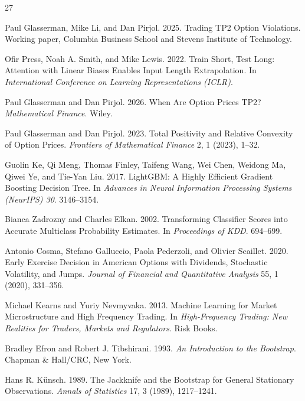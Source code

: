 \documentclass[sigconf,review,anonymous]{acmart}
\begin{document}

\begingroup
\footnotesize
\setlength{\itemsep}{0pt}
\setlength{\parskip}{0pt}
\begin{thebibliography}{27}

Paul Glasserman, Mike Li, and Dan Pirjol. 2025. Trading TP2 Option Violations. Working paper, Columbia Business School and Stevens Institute of Technology.

Ofir Press, Noah A. Smith, and Mike Lewis. 2022. Train Short, Test Long: Attention with Linear Biases Enables Input Length Extrapolation. In \textit{International Conference on Learning Representations (ICLR)}.

Paul Glasserman and Dan Pirjol. 2026. When Are Option Prices TP2? \textit{Mathematical Finance}. Wiley.

Paul Glasserman and Dan Pirjol. 2023. Total Positivity and Relative Convexity of Option Prices. \textit{Frontiers of Mathematical Finance} 2, 1 (2023), 1--32.

Guolin Ke, Qi Meng, Thomas Finley, Taifeng Wang, Wei Chen, Weidong Ma, Qiwei Ye, and Tie-Yan Liu. 2017. LightGBM: A Highly Efficient Gradient Boosting Decision Tree. In \textit{Advances in Neural Information Processing Systems (NeurIPS) 30}. 3146--3154.

Bianca Zadrozny and Charles Elkan. 2002. Transforming Classifier Scores into Accurate Multiclass Probability Estimates. In \textit{Proceedings of KDD}. 694--699.

Antonio Cosma, Stefano Galluccio, Paola Pederzoli, and Olivier Scaillet. 2020. Early Exercise Decision in American Options with Dividends, Stochastic Volatility, and Jumps. \textit{Journal of Financial and Quantitative Analysis} 55, 1 (2020), 331--356.

Michael Kearns and Yuriy Nevmyvaka. 2013. Machine Learning for Market Microstructure and High Frequency Trading. In \textit{High-Frequency Trading: New Realities for Traders, Markets and Regulators}. Risk Books.

Bradley Efron and Robert J. Tibshirani. 1993. \textit{An Introduction to the Bootstrap}. Chapman \& Hall/CRC, New York.

Hans R. K\"unsch. 1989. The Jackknife and the Bootstrap for General Stationary Observations. \textit{Annals of Statistics} 17, 3 (1989), 1217--1241.


\end{thebibliography}
\end{document}
